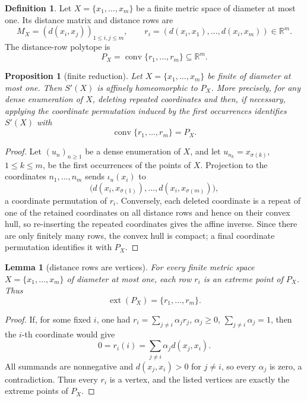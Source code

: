 \documentclass{proc-l}
\numberwithin{equation}{section}
\newtheorem{proposition}[theorem]{Proposition}
\newtheorem{lemma}[theorem]{Lemma}
\theoremstyle{definition}
\newtheorem{definition}[theorem]{Definition}
\theoremstyle{remark}
\newcommand{\R}{\mathbb R}
\newcommand{\ext}{\operatorname{ext}}
\newcommand{\conv}{\operatorname{conv}}
\begin{document}
\begin{definition}
Let \(X=\{x_1,\ldots,x_m\}\) be a finite metric space of diameter at most one.
Its distance matrix and distance rows are
\[
        M_X=(d(x_i,x_j))_{1\le i,j\le m},
        \qquad
        r_i=(d(x_i,x_1),\ldots,d(x_i,x_m))\in\R^m.
\]
The distance-row polytope is
\[
        P_X=\conv\{r_1,\ldots,r_m\}\subseteq\R^m.
\]
\end{definition}

\begin{proposition}[finite reduction]\label{prop:finite-reduction}
Let \(X=\{x_1,\ldots,x_m\}\) be finite of diameter at most one.  Then \(S'(X)\)
is affinely homeomorphic to \(P_X\).  More precisely, for any dense enumeration
of \(X\), deleting repeated coordinates and then, if necessary, applying the
coordinate permutation induced by the first occurrences identifies \(S'(X)\)
with
\[
        \conv\{r_1,\ldots,r_m\}=P_X.
\]
\end{proposition}

\begin{proof}
Let \((u_n)_{n\ge1}\) be a dense enumeration of \(X\), and let
\(u_{n_k}=x_{\sigma(k)}\), \(1\le k\le m\), be the first occurrences of the
points of \(X\).  Projection to the coordinates \(n_1,\ldots,n_m\) sends
\(\iota_u(x_i)\) to
\[
        \bigl(d(x_i,x_{\sigma(1)}),\ldots,d(x_i,x_{\sigma(m)})\bigr),
\]
a coordinate permutation of \(r_i\).  Conversely, each deleted coordinate is a
repeat of one of the retained coordinates on all distance rows and hence on
their convex hull, so re-inserting the repeated coordinates gives the affine
inverse.  Since there are only finitely many rows, the convex hull is compact;
a final coordinate permutation identifies it with \(P_X\).
\end{proof}

\begin{lemma}[distance rows are vertices]\label{lem:rows-vertices}
For every finite metric space \(X=\{x_1,\ldots,x_m\}\) of diameter at most one,
each row \(r_i\) is an extreme point of \(P_X\).  Thus
\[
        \ext(P_X)=\{r_1,\ldots,r_m\}.
\]
\end{lemma}

\begin{proof}
If, for some fixed \(i\), one had
\(r_i=\sum_{j\ne i}\alpha_jr_j\), \(\alpha_j\ge0\), \(\sum_{j\ne i}\alpha_j=1\),
then the \(i\)-th coordinate would give
\[
        0=r_i(i)=\sum_{j\ne i}\alpha_jd(x_j,x_i).
\]
All summands are nonnegative and \(d(x_j,x_i)>0\) for \(j\ne i\), so every
\(\alpha_j\) is zero, a contradiction.  Thus every \(r_i\) is a vertex, and the
listed vertices are exactly the extreme points of \(P_X\).
\end{proof}
\end{document}
